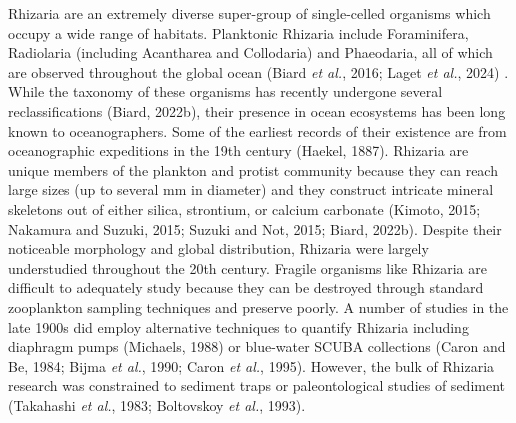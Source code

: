 \documentclass[
]{article}
\begin{document}
Rhizaria are an extremely diverse super-group of single-celled organisms
which occupy a wide range of habitats. Planktonic Rhizaria include
Foraminifera, Radiolaria (including Acantharea and Collodaria) and
Phaeodaria, all of which are observed throughout the global ocean (Biard
\emph{et al.}, 2016; Laget \emph{et al.}, 2024) . While the taxonomy of
these organisms has recently undergone several reclassifications (Biard,
2022b), their presence in ocean ecosystems has been long known to
oceanographers. Some of the earliest records of their existence are from
oceanographic expeditions in the 19th century (Haekel, 1887). Rhizaria
are unique members of the plankton and protist community because they
can reach large sizes (up to several mm in diameter) and they construct
intricate mineral skeletons out of either silica, strontium, or calcium
carbonate (Kimoto, 2015; Nakamura and Suzuki, 2015; Suzuki and Not,
2015; Biard, 2022b). Despite their noticeable morphology and global
distribution, Rhizaria were largely understudied throughout the 20th
century. Fragile organisms like Rhizaria are difficult to adequately
study because they can be destroyed through standard zooplankton
sampling techniques and preserve poorly. A number of studies in the late
1900s did employ alternative techniques to quantify Rhizaria including
diaphragm pumps (Michaels, 1988) or blue-water SCUBA collections (Caron
and Be, 1984; Bijma \emph{et al.}, 1990; Caron \emph{et al.}, 1995).
However, the bulk of Rhizaria research was constrained to sediment traps
or paleontological studies of sediment (Takahashi \emph{et al.}, 1983;
Boltovskoy \emph{et al.}, 1993).
\end{document}
